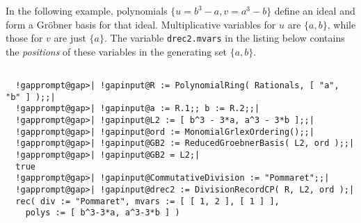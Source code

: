 \documentclass[a4paper,11pt]{report}
\begin{document}
{{{ In the following example, polynomials $\{u = b^3-a, v=a^3-b\}$ define an ideal and form a Gr{\"o}bner basis for that ideal. Multiplicative
variables for $u$ are $\{a,b\}$, while those for $v$ are just $\{a\}$. The variable \texttt{drec2.mvars} in the listing below contains the \emph{positions} of these variables in the generating set $\{a,b\}$. }

 
\begin{Verbatim}[commandchars=!@|,fontsize=\small,frame=single,label=Example]
  
  !gapprompt@gap>| !gapinput@R := PolynomialRing( Rationals, [ "a", "b" ] );;|
  !gapprompt@gap>| !gapinput@a := R.1;; b := R.2;;|
  !gapprompt@gap>| !gapinput@L2 := [ b^3 - 3*a, a^3 - 3*b ];;|
  !gapprompt@gap>| !gapinput@ord := MonomialGrlexOrdering();;|
  !gapprompt@gap>| !gapinput@GB2 := ReducedGroebnerBasis( L2, ord );;|
  !gapprompt@gap>| !gapinput@GB2 = L2;|
  true
  !gapprompt@gap>| !gapinput@CommutativeDivision := "Pommaret";;|
  !gapprompt@gap>| !gapinput@drec2 := DivisionRecordCP( R, L2, ord );|
  rec( div := "Pommaret", mvars := [ [ 1, 2 ], [ 1 ] ], 
    polys := [ b^3-3*a, a^3-3*b ] )
  
\end{Verbatim}
 
}}
\end{document}
